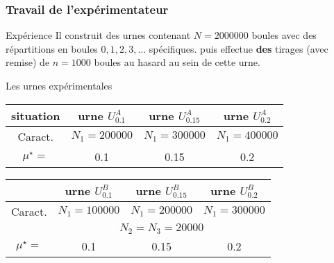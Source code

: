 \documentclass[11pt]{beamer}
\newcommand{\Sim}{{\star}}
\begin{document}
\begin{frame}
\frametitle{Travail de l'expérimentateur}
\begin{alertblock}{Expérience}
Il construit des urnes contenant $N=2000000$ boules avec des répartitions en boules $0,1,2,3,\ldots$ spécifiques.
puis effectue \textbf{des} tirages (avec remise) de $n=1000$ boules au hasard au sein de cette urne.
\end{alertblock}

\begin{exampleblock}{Les urnes expérimentales}
\begin{center}
\begin{tabular}{|c|c|c|c|}
\hline 
situation & urne $U_{0.1}^A$ & urne $U_{0.15}^A$ & urne $U_{0.2}^A$ \\
\hline
Caract. & $N_1=200000$ &  $N_1=300000$ & $N_1=400000$  \\
\hline
$\mu^\Sim=$ & 0.1 & 0.15 & 0.2 \\
\hline
\end{tabular}
\end{center}
\begin{center}
\begin{tabular}{|c|c|c|c|}
\hline
& urne $U_{0.1}^B$ & urne $U_{0.15}^B$ & urne $U_{0.2}^B$ \\
\hline
Caract. & $N_1=100000$ &  $N_1=200000$ & $N_1=300000$  \\
& \multicolumn{3}{|c|}{$N_2=N_3=20000$} \\
\hline
$\mu^\Sim=$ & 0.1 & 0.15 & 0.2 \\
\hline
\end{tabular}
\end{center}
\end{exampleblock}
\end{frame}
\end{document}
